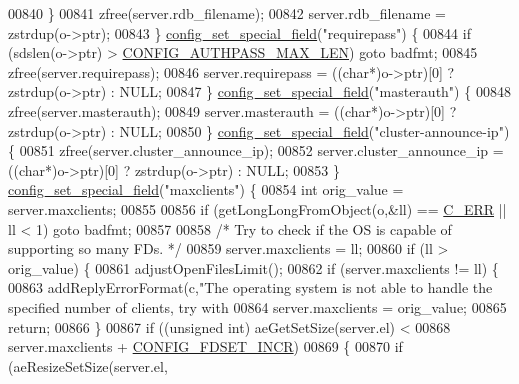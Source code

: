 \begin{DoxyCode}
{{{{{{00840         \}
00841         zfree(server.rdb\_filename);
00842         server.rdb\_filename = zstrdup(o->ptr);
00843     \} \hyperlink{config_8c_a7bdda941057dd2668e0e5b5df1d3ab4c}{config\_set\_special\_field}(\textcolor{stringliteral}{"requirepass"}) \{
00844         \textcolor{keywordflow}{if} (sdslen(o->ptr) > \hyperlink{server_8h_a8e9d7cd814b95c2cbd17701efe1374f2}{CONFIG\_AUTHPASS\_MAX\_LEN}) \textcolor{keywordflow}{goto} badfmt;
00845         zfree(server.requirepass);
00846         server.requirepass = ((\textcolor{keywordtype}{char}*)o->ptr)[0] ? zstrdup(o->ptr) : NULL;
00847     \} \hyperlink{config_8c_a7bdda941057dd2668e0e5b5df1d3ab4c}{config\_set\_special\_field}(\textcolor{stringliteral}{"masterauth"}) \{
00848         zfree(server.masterauth);
00849         server.masterauth = ((\textcolor{keywordtype}{char}*)o->ptr)[0] ? zstrdup(o->ptr) : NULL;
00850     \} \hyperlink{config_8c_a7bdda941057dd2668e0e5b5df1d3ab4c}{config\_set\_special\_field}(\textcolor{stringliteral}{"cluster-announce-ip"}) \{
00851         zfree(server.cluster\_announce\_ip);
00852         server.cluster\_announce\_ip = ((\textcolor{keywordtype}{char}*)o->ptr)[0] ? zstrdup(o->ptr) : NULL;
00853     \} \hyperlink{config_8c_a7bdda941057dd2668e0e5b5df1d3ab4c}{config\_set\_special\_field}(\textcolor{stringliteral}{"maxclients"}) \{
00854         \textcolor{keywordtype}{int} orig\_value = server.maxclients;
00855 
00856         \textcolor{keywordflow}{if} (getLongLongFromObject(o,&ll) == \hyperlink{server_8h_af98ac28d5f4d23d7ed5985188e6fb7d1}{C\_ERR} || ll < 1) \textcolor{keywordflow}{goto} badfmt;
00857 
00858         \textcolor{comment}{/* Try to check if the OS is capable of supporting so many FDs. */}
00859         server.maxclients = ll;
00860         \textcolor{keywordflow}{if} (ll > orig\_value) \{
00861             adjustOpenFilesLimit();
00862             \textcolor{keywordflow}{if} (server.maxclients != ll) \{
00863                 addReplyErrorFormat(c,\textcolor{stringliteral}{"The operating system is not able to handle the specified number
       of clients, try with %
00864                 server.maxclients = orig\_value;
00865                 \textcolor{keywordflow}{return};
00866             \}
00867             \textcolor{keywordflow}{if} ((\textcolor{keywordtype}{unsigned} \textcolor{keywordtype}{int}) aeGetSetSize(server.el) <
00868                 server.maxclients + \hyperlink{server_8h_a6725c1ff5b6a17f930627263f484d107}{CONFIG\_FDSET\_INCR})
00869             \{
00870                 \textcolor{keywordflow}{if} (aeResizeSetSize(server.el,
}}}}}}}
\end{DoxyCode}
